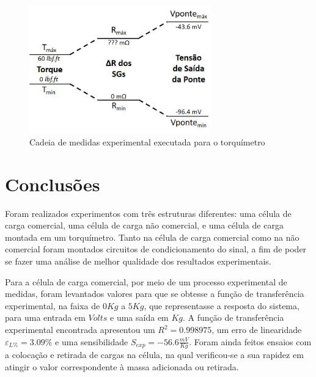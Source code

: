 \documentclass[a4paper]{instrumentacao}
\begin{document}
\begin{figure}[H]
\center
\includegraphics[width=0.7\textwidth]{CadeiaMedidasExperimental_Torquimetro.jpg}
\caption{Cadeia de medidas experimental executada para o torquímetro}
\label{fig:torquimetro-cadeia-medidas-experimental}
\end{figure}

\chapter{Conclusões}

Foram realizados experimentos com três estruturas diferentes: uma célula de carga comercial, uma célula de carga não comercial, e uma célula de carga montada em um torquímetro. Tanto na célula de carga comercial como na não comercial foram montados circuitos de condicionamento do sinal, a fim de poder se fazer uma análise de melhor qualidade dos resultados experimentais.

Para a célula de carga comercial, por meio de um processo experimental de medidas, foram levantados valores para que se obtesse a função de transferência experimental, na faixa de $0Kg$ a $5Kg$, que representasse a resposta do sistema, para uma entrada em $Volts$ e uma saída em $Kg$. A função de transferência experimental encontrada apresentou um $R^2=0.998975$, um erro de linearidade $\varepsilon_{L\%}=3.09\%$ e uma sensibilidade $S_{exp}=-56.6\frac{mV}{Kg}$. Foram ainda feitos ensaios com a colocação e retirada de cargas na célula, na qual verificou-se a sua rapidez em atingir o valor correspondente à massa adicionada ou retirada.
\end{document}
